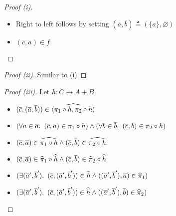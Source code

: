 \begin{prop}
\begin{proof}[Proof (i)]
\begin{itemize}
      \item[\phantom{\imps}]
        Right to left follows by setting $(\overline{a},\overline{b})\triangleq(\{a\},\varnothing)$

      \item[\iffs]
        $(\overline{c},a)\in f$
        \qedhere
    \end{itemize}
  \end{proof}

  \begin{proof}[Proof (ii)]
    Similar to (i)\qedhere
  \end{proof}

  \begin{proof}[Proof (iii)]
    Let $h : C\to A+B$
    \begin{itemize}
      \item[\phantom{\imps}]
        $(\overline{c}, (\overline{a}, \overline{b}))\in\widehat{\langle\pi_1\circ h,\pi_2\circ h\rangle}$

      \item[\iffs]
        $(\forall a\in\overline{a}\ldotp~(\overline{c},a)\in\pi_1\circ h)\land(\forall b\in\overline{b}\ldotp~(\overline{c},b)\in\pi_2\circ h)$

      \item[\iffs]
        $(\overline{c},\overline{a})\in\widehat{\pi_1\circ h}\land(\overline{c},\overline{b})\in\widehat{\pi_2\circ h}$
        \marginnote{\Def-$~\widehat{\cdot}$}

      \item[\iffs]
        $(\overline{c},\overline{a})\in\widehat{\pi}_1\circ\widehat{h}\land(\overline{c},\overline{b})\in\widehat{\pi}_2\circ\widehat{h}$
        \marginnote{\Def-\ref{prop:rel-hat-comp}}

      \item[\iffs]
        $(\exists(\overline{a}^\prime,\overline{b}^\prime)\ldotp~(\overline{c},(\overline{a}^\prime,\overline{b}^\prime))\in\widehat{h}\land((\overline{a}^\prime,\overline{b}^\prime),\overline{a})\in\widehat{\pi}_1)$

      \addtolength{\itemsep}{-.4\baselineskip}
      \item[\phantom{\iffs}\llap{$\land$}] $(\exists(\overline{a}^\prime,\overline{b}^\prime)\ldotp~(\overline{c},(\overline{a}^\prime,\overline{b}^\prime))\in\widehat{h}\land((\overline{a}^\prime,\overline{b}^\prime),\overline{b})\in\widehat{\pi}_2)$
      \addtolength{\itemsep}{.4\baselineskip}


\end{itemize}
\end{proof}
\end{prop}
